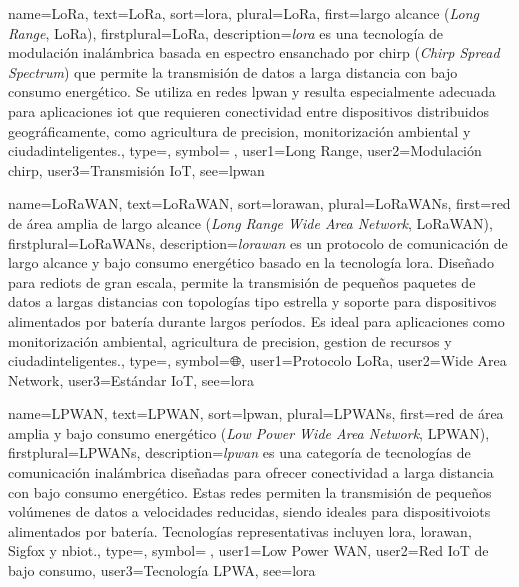 	{
		name={LoRa},
		text={LoRa},
		sort={lora},
		plural={LoRa},
		first={largo alcance (\textit{Long Range}, LoRa)},
		firstplural={LoRa},
		description={\emph{\gls{lora}} es una tecnolog{\'i}a de modulaci{\'o}n inal{\'a}mbrica basada en espectro ensanchado por chirp (\textit{Chirp Spread Spectrum}) que permite la transmisi{\'o}n de datos a larga distancia con bajo consumo energ{\'e}tico. Se utiliza en redes \gls{lpwan} y resulta especialmente adecuada para aplicaciones \gls{iot} que requieren \gls{conectividad} entre \glspl{dispositivo} distribuidos geogr{\'a}ficamente, como agricultura de \gls{precision}, monitorizaci{\'o}n ambiental y \glspl{ciudadinteligente}.},
		type=\glsdefaulttype,
		symbol={📡},
		user1={Long Range},
		user2={Modulaci{\'o}n chirp},
		user3={Transmisi{\'o}n IoT},
		see={lpwan}
	}
	
	{
		name={LoRaWAN},
		text={LoRaWAN},
		sort={lorawan},
		plural={LoRaWANs},
		first={red de {\'a}rea amplia de largo alcance (\textit{Long Range Wide Area Network}, LoRaWAN)},
		firstplural={LoRaWANs},
		description={\emph{\gls{lorawan}} es un protocolo de comunicaci{\'o}n de largo alcance y bajo consumo energ{\'e}tico basado en la tecnolog{\'i}a \gls{lora}. Dise{\~n}ado para \glspl{rediot} de gran escala, permite la transmisi{\'o}n de peque{\~n}os paquetes de datos a largas distancias con topolog{\'i}as tipo estrella y soporte para \glspl{dispositivo} alimentados por bater{\'i}a durante largos per{\'i}odos. Es ideal para aplicaciones como monitorizaci{\'o}n ambiental, agricultura de \gls{precision}, \gls{gestion} de recursos y \glspl{ciudadinteligente}.},
		type=\glsdefaulttype,
		symbol={🌐},
		user1={Protocolo LoRa},
		user2={Wide Area Network},
		user3={Est{\'a}ndar IoT},
		see={lora}
	}
	
	{
		name={LPWAN},
		text={LPWAN},
		sort={lpwan},
		plural={LPWANs},
		first={red de {\'a}rea amplia y bajo consumo energ{\'e}tico (\textit{Low Power Wide Area Network}, LPWAN)},
		firstplural={LPWANs},
		description={\emph{\gls{lpwan}} es una categor{\'i}a de tecnolog{\'i}as de comunicaci{\'o}n inal{\'a}mbrica dise{\~n}adas para ofrecer \gls{conectividad} a larga distancia con bajo consumo energ{\'e}tico. Estas redes permiten la transmisi{\'o}n de peque{\~n}os vol{\'u}menes de datos a velocidades reducidas, siendo ideales para \glspl{dispositivoiot} alimentados por bater{\'i}a. Tecnolog{\'i}as representativas incluyen \gls{lora}, \gls{lorawan}, Sigfox y \gls{nbiot}.},
		type=\glsdefaulttype,
		symbol={🔋},
		user1={Low Power WAN},
		user2={Red IoT de bajo consumo},
		user3={Tecnolog{\'i}a LPWA},
		see={lora}
	}
	
